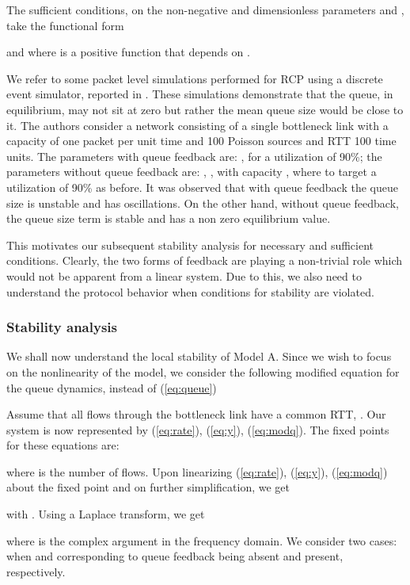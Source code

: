 \documentclass[conference]{IEEEtran}
\begin{document}
The sufficient conditions, on the non-negative
and dimensionless parameters  and , take the functional form

and  where  is a positive function
that depends on .        

We refer to some packet level simulations performed for RCP using a discrete event simulator,
reported in \cite[Fig.~5]{krv}. These simulations demonstrate that the queue, in equilibrium, may not sit at zero but rather the mean queue size would be close to it. The authors consider a network consisting of a single bottleneck link with a capacity  of one packet per unit 
time and 100 Poisson sources and RTT 100 time units. The parameters with queue 
feedback are: ,  for a utilization of 90\%; the parameters without queue feedback 
are: , , with capacity , where  to target a utilization of 90\% as before. It was observed that with queue feedback the queue size is unstable and has oscillations. On the other hand, 
without queue feedback, the queue size term is 
stable and has a non zero equilibrium value. 

This motivates our subsequent 
stability analysis for necessary and sufficient conditions.
Clearly, the two forms of feedback are playing a non-trivial 
role which would not be apparent from a linear system. 
Due to this, we also need to understand the protocol behavior when conditions for stability are violated.

\subsubsection{Stability analysis}
We shall now understand the local stability of Model A. Since we wish to focus on the nonlinearity
of the model, we consider the following modified equation for the queue dynamics, instead of (\ref{eq:queue})



Assume that all flows through the bottleneck link have a common RTT, . Our system 
is now represented by (\ref{eq:rate}), (\ref{eq:y}), (\ref{eq:modq}). The fixed points for these equations are: 

where  is the number of flows. Upon linearizing (\ref{eq:rate}), (\ref{eq:y}), 
(\ref{eq:modq}) about the fixed point and on further simplification, we get

with . Using a Laplace transform, we get

where  is the complex argument in the frequency domain. We consider two cases: when  and  corresponding to queue feedback being absent and present, respectively.
\end{document}
